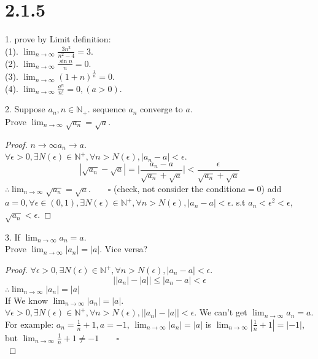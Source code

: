 \section{2.1.5}
\date{2021.5.5}
\begin{qs}
1. prove by Limit definition:\\
(1). $ \lim_{n\rightarrow\infty}\frac{3n^2}{n^2-4} = 3 $.\\
(2). $ \lim_{n\rightarrow\infty}\frac{\sin n}{n} = 0 $.\\
(3). $ \lim_{n\rightarrow\infty}(1+n)^\frac{1}{n} = 0 $.\\
(4). $ \lim_{n\rightarrow\infty}\frac{a^n}{n!} = 0, (a>0) $.\\

\end{qs}

\begin{qs}
2. Suppose $ a_n, n\in\mathbb{N}_+ $. sequence {$ a_n $} converge to $ a $.\\ Prove $ \lim_{n\rightarrow\infty}\sqrt{a_n} = \sqrt{a} $.

\end{qs}
\begin{proof}
$ n\rightarrow\infty  a_n \rightarrow a $.\\
$ \forall \epsilon >0, \exists N(\epsilon) \in \mathbb{N}^+, \forall n>N(\epsilon), |a_n - a|<\epsilon $.
\begin{equation*}
	|\sqrt{a_n}-\sqrt{a}| = \Big|\frac{a_n-a}{\sqrt{a_n}+\sqrt{a}}\Big| < \frac{\epsilon}{\sqrt{a_n}+\sqrt{a}}
\end{equation*}
$ \therefore \lim_{n\rightarrow\infty}\sqrt{a_n} = \sqrt{a}. \qquad\square  $
(check, not consider the condition$ a=0 $)
add $ a=0, \forall \epsilon \in (0,1), \exists N(\epsilon) \in \mathbb{N}^+, \forall n>N(\epsilon), |a_n - a|<\epsilon $. s.t $ a_n<\epsilon^2 <\epsilon $, $ \sqrt{a_n} < \epsilon $.
\end{proof}

\begin{qs}
3. If $ \lim_{n\rightarrow\infty} a_n = a $.\\ Prove $ \lim_{n\rightarrow\infty} |a_n| = |a| $. Vice versa?\\

\end{qs}
\begin{proof}
$ \forall \epsilon>0, \exists N(\epsilon) \in \mathbb{N}^+, \forall n>N(\epsilon), |a_n - a| <\epsilon$. 
\begin{equation*}
	\Big| |a_n| - |a| \Big| \leqslant|a_n - a| <\epsilon
\end{equation*}
$ \therefore \lim_{n\rightarrow\infty} |a_n| = |a| $\\
If We know $ \lim_{n\rightarrow\infty} |a_n| = |a| $.\\
$ \forall \epsilon>0, \exists N(\epsilon) \in \mathbb{N}^+, \forall n>N(\epsilon), \big||a_n| - |a|\big| <\epsilon$.  We can't get $ \lim_{n\rightarrow\infty} a_n = a $. For example: $ a_n = \frac{1}{n}+1, a = -1 $, $ \lim_{n\rightarrow\infty} |a_n| = |a| $ is $ \lim_{n\rightarrow\infty} |\frac{1}{n}+1| = |-1| $, but $ \lim_{n\rightarrow\infty} \frac{1}{n}+1 \neq -1 \qquad\square $\\
\end{proof}

